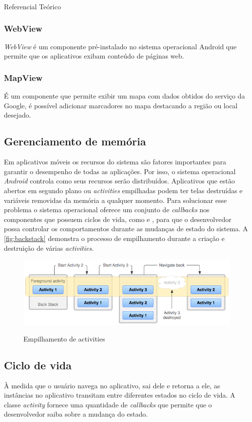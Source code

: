 \documentclass[
	12pt,				%
	openany,			%
	twoside,			%
	a4paper,			%
	english,			%
	french,				%
	spanish,			%
	brazil				%
	]{abntex2}
\begin{document}
\begin{chapter}{Referencial Teórico}
\subsubsection{WebView} \label{WebView}
\textit{WebView} é um componente pré-instalado no sistema operacional Android que permite que os aplicativos exibam conteúdo de páginas web.

\subsubsection{MapView} \label{MapView}
É um componente que permite exibir um mapa com dados obtidos do serviço da Google, é possível adicionar marcadores no mapa destacando a região ou local desejado.


\newpage
\subsection{Gerenciamento de memória}
Em aplicativos móveis os recursos do sistema são fatores importantes para garantir o desempenho de todas as aplicações. Por isso, o sistema operacional \textit{Android} controla como seus recursos serão distribuídos. Aplicativos que estão abertos em segundo plano ou \textit{activities} empilhadas podem ter telas destruídas e variáveis removidas da memória a qualquer momento. Para solucionar esse problema o sistema operacional oferece um conjunto de \textit{callbacks} nos componentes que possuem ciclos de vida, como  e , para que o desenvolvedor possa controlar os comportamentos durante as mudanças de estado do sistema. A \autoref{fig:backstack} demonstra o processo de empilhamento durante a criação e destruição de várias \textit{activities}.

\begin{figure}[h]
\centering
   \caption{Empilhamento de activities}
   \includegraphics[scale=0.70]{media/diagram_backstack.png}
     \label{fig:backstack}
\end{figure}

\subsection{Ciclo de vida}
À medida que o usuário navega no aplicativo, sai dele e retorna a ele, as instâncias  no aplicativo transitam entre diferentes estados no ciclo de vida. A classe \textit{activity} fornece uma quantidade de \textit{callbacks} que permite que o desenvolvedor saiba sobre a mudança do estado.


\end{chapter}
\end{document}
